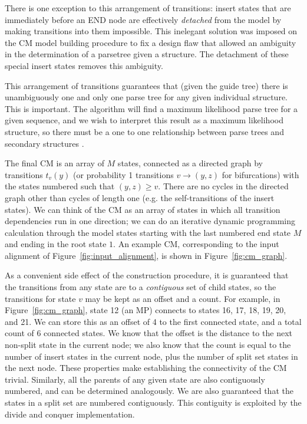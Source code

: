 There is one exception to this arrangement of transitions: insert
states that are immediately before an END node are effectively
\emph{detached} from the model by making transitions into them
impossible. This inelegant solution was imposed on the CM model
building procedure to fix a design flaw that allowed an ambiguity in
the determination of a parsetree given a structure. The detachment of
these special insert states removes this ambiguity.

This arrangement of transitions guarantees that (given the guide tree)
there is unambiguously one and only one parse tree for any given
individual structure. This is important. The algorithm will find a
maximum likelihood parse tree for a given sequence, and we wish to
interpret this result as a maximum likelihood structure, so there must
be a one to one relationship between parse trees and secondary
structures \citep{Giegerich00}.

The final CM is an array of $M$ states, connected as a directed graph
by transitions $t_v(y)$ (or probability 1 transitions $v \rightarrow
(y,z)$ for bifurcations) with the states numbered such that $(y,z)
\geq v$. There are no cycles in the directed graph other than cycles
of length one (e.g. the self-transitions of the insert states). We can
think of the CM as an array of states in which all transition
dependencies run in one direction; we can do an iterative dynamic
programming calculation through the model states starting with the
last numbered end state $M$ and ending in the root state $1$.  An
example CM, corresponding to the input alignment of
Figure~\ref{fig:input_alignment}, is shown in
Figure~\ref{fig:cm_graph}.

As a convenient side effect of the construction procedure, it is
guaranteed that the transitions from any state are to a
\emph{contiguous} set of child states, so the transitions for state
$v$ may be kept as an offset and a count. For example, in
Figure~\ref{fig:cm_graph}, state 12 (an MP) connects to states 16, 17,
18, 19, 20, and 21. We can store this as an offset of 4 to the first
connected state, and a total count of 6 connected states.  We know
that the offset is the distance to the next non-split state in the
current node; we also know that the count is equal to the number of
insert states in the current node, plus the number of split set states
in the next node. These properties make establishing the connectivity
of the CM trivial. Similarly, all the parents of any given state are
also contiguously numbered, and can be determined analogously. We are
also guaranteed that the states in a split set are numbered
contiguously.  This contiguity is exploited by the divide and conquer
implementation.

